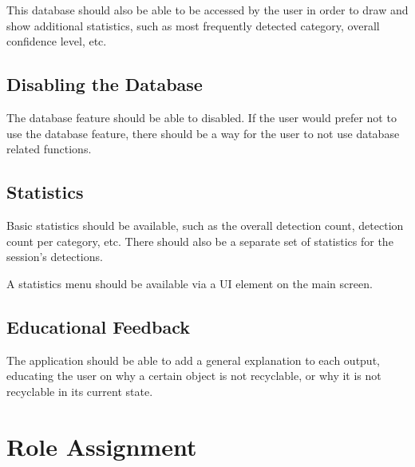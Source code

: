 \documentclass[conference]{IEEEtran}
\begin{document}
This database should also be able to be accessed by the user in order to draw and show additional statistics, such as most frequently detected category, overall confidence level, etc.
\newline
\subsection{Disabling the Database}
The database feature should be able to disabled. If the user would prefer not to use the database feature, there should be a way for the user to not use database related functions.
\newline
\subsection{Statistics}
Basic statistics should be available, such as the overall detection count, detection count per category, etc. There should also be a separate set of statistics for the session's detections.

A statistics menu should be available via a UI element on the main screen.
\newline
\subsection{Educational Feedback}
The application should be able to add a general explanation to each output, educating the user on why a certain object is not recyclable, or why it is not recyclable in its current state.

\newpage
\section{Role Assignment}
\end{document}
